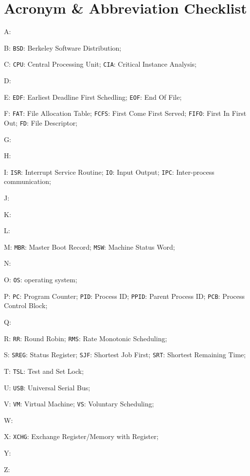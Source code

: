 \documentclass[12pt,a4paper]{article}
\theoremstyle{definition}
\begin{document}
\newpage
\section{Acronym \& Abbreviation Checklist}
A:

B: \texttt{BSD}: Berkeley Software Distribution; 

C: \texttt{CPU}: Central Processing Unit; \texttt{CIA}: Critical Instance Analysis; 

D:

E: \texttt{EDF}: Earliest Deadline First Schedling; \texttt{EOF}: End Of File; 

F: \texttt{FAT}: File Allocation Table; \texttt{FCFS}: First Come First Served; \texttt{FIFO}: First In First Out; \texttt{FD}: File Descriptor; 

G:

H:

I: \texttt{ISR}: Interrupt Service Routine; \texttt{IO}: Input Output; \texttt{IPC}: Inter-process communication;

J:

K:

L:

M: \texttt{MBR}: Master Boot Record;  \texttt{MSW}: Machine Status Word;

N:

O: \texttt{OS}: operating system; 

P: \texttt{PC}: Program Counter; \texttt{PID}: Process ID; \texttt{PPID}: Parent Process ID; \texttt{PCB}: Process Control Block;

Q:

R: \texttt{RR}: Round Robin; \texttt{RMS}: Rate Monotonic Scheduling; 

S: \texttt{SREG}: Status Register;
  \texttt{SJF}: Shortest Job First; \texttt{SRT}: Shortest Remaining Time;

T: \texttt{TSL}: Test and Set Lock;

U: \texttt{USB}: Universal Serial Bus;

V: \texttt{VM}: Virtual Machine; \texttt{VS}: Voluntary Scheduling; 

W:

X: \texttt{XCHG}: Exchange Register/Memory with Register;

Y:

Z:



\end{document}
